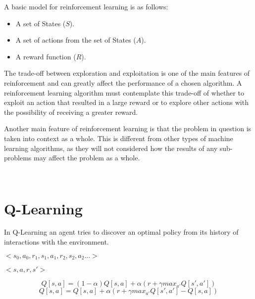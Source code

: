 A basic model for reinforcement learning is as follows:
\begin{itemize}
\item A set of States ($S$).
\item A set of actions from the set of States ($A$).
\item A reward function ($R$).
\end{itemize}

The trade-off between exploration and exploitation is one of the main features of reinforcement and can greatly affect the performance of a chosen algorithm. A reinforcement learning algorithm must contemplate this trade-off of whether to exploit an action that resulted in a large reward or to explore other actions with the possibility of receiving a greater reward.

Another main feature of reinforcement learning is that the problem in question is taken into context as a whole. This is different from other types of machine learning algorithms, as they will not considered how the results of any sub-problems may affect the problem as a whole.

~\cite{barto1998reinforcement}
\section{Q-Learning}\label{qlearning}
In Q-Learning an agent tries to discover an optimal policy from its history of interactions with the environment.
\begin{center}
$<s_{0},a_{0},r_{1},s_{1},a_{1},r_{2},s_{2},a_{2}...>$
\end{center}

\begin{center}
$<s,a,r,s'>$
\end{center}


\begin{equation}
Q[s,a] = (1-\alpha) Q[s,a] + \alpha(r+ {\gamma}max_{a'} Q[s',a'])
\end{equation}
\begin{equation}
Q[s,a] = Q[s,a] + {\alpha}(r+ {\gamma}max_{a'} Q[s',a'] - Q[s,a])
\end{equation}

~\cite{poole2010artificial}